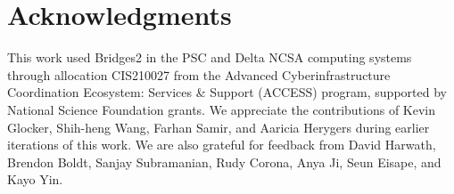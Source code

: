 \documentclass[11pt]{article}
\newcommand{\shinji}[1]{{\color[HTML]{990000}[Shinji: #1]}}
\newcommand{\kalvin}[1]{{\color[HTML]{2596be}[Kalvin: #1]}}
\begin{document}










\section*{Acknowledgments}
This work used Bridges2 in the PSC and Delta NCSA computing systems through allocation CIS210027 from the Advanced Cyberinfrastructure Coordination Ecosystem: Services \& Support (ACCESS) program, supported by National Science Foundation grants.
We appreciate the contributions of Kevin Glocker, Shih-heng Wang, Farhan Samir, and Aaricia Herygers during earlier iterations of this work. 
We are also grateful for feedback from David Harwath, Brendon Boldt, Sanjay Subramanian, Rudy Corona, Anya Ji, Seun Eisape, and Kayo Yin.





\newpage
\appendix


\end{document}
